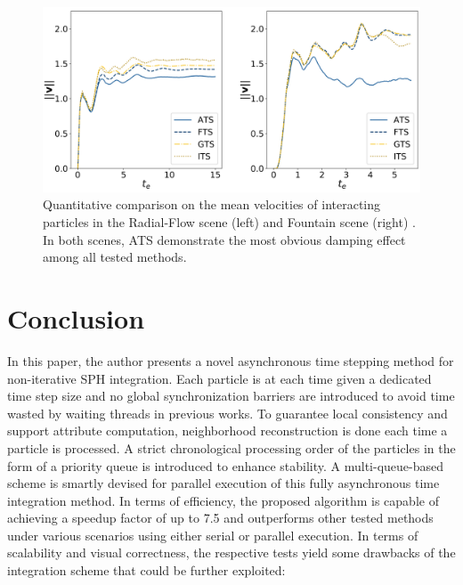 \documentclass[
	11pt, 
	DIV10,
	ngerman,
	a4paper, 
	oneside, 
	headings=normal, 
	captions=tableheading,
	final, 
	numbers=noenddot
]{scrartcl}
\begin{document}
\begin{figure}[tb]
	\centering
	\includegraphics[scale=0.2]{images/10}
	\caption{\label{fig9} Quantitative comparison on the mean velocities of interacting particles in the Radial-Flow scene (left) and Fountain scene (right) \cite{reinhardt2017fully}. In both scenes, ATS demonstrate the most obvious damping effect among all tested methods.}
\end{figure}


\section{Conclusion}

In this paper, the author presents a novel asynchronous time stepping method for non-iterative SPH integration. Each particle is at each time given a dedicated time step size and no global synchronization barriers are introduced to avoid time wasted by waiting threads in previous works. To guarantee local consistency and support attribute computation, neighborhood reconstruction is done each time a particle is processed. A strict chronological processing order of the particles in the form of a priority queue is introduced to enhance stability. A multi-queue-based scheme is smartly devised for parallel execution of this fully asynchronous time integration method. In terms of efficiency, the proposed algorithm is capable of achieving a speedup factor of up to 7.5 and outperforms other tested methods under various scenarios using either serial or parallel execution. In terms of scalability and visual correctness, the respective tests yield some drawbacks of the integration scheme that could be further exploited:
\end{document}
